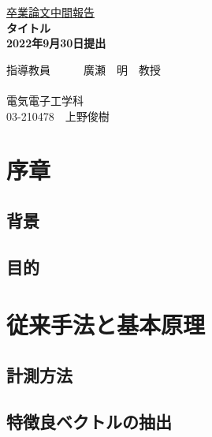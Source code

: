 \documentclass[uplatex,a4paper,10pt]{jsarticle}
\begin{document}
\begin{center}
\vspace*{3cm} \underline{\HUGE 卒業論文中間報告 }\\
\vspace{1cm}
\bf{ \Huge タイトル\\}
\vspace{3cm}
\huge 2022年9月30日提出 \\
\vspace{3cm}
\end{center}
\begin{minipage}{0.4\hsize}
\hspace{1zw}
\end{minipage}
\begin{center}
\begin{minipage}{0.7\hsize}
{\huge 指導教員　　　廣瀬　明　教授\\}
\vspace{1cm}\\
\centering
{\huge 電気電子工学科\\}
{\huge 03-210478　上野俊樹}
\end{minipage}
\end{center}


\newpage
\tableofcontents

\newpage 

\section{序章}

\subsection{背景}


\subsection{目的}

\section{従来手法と基本原理}

\subsection{計測方法}



\subsection{特徴良ベクトルの抽出}
\end{document}
